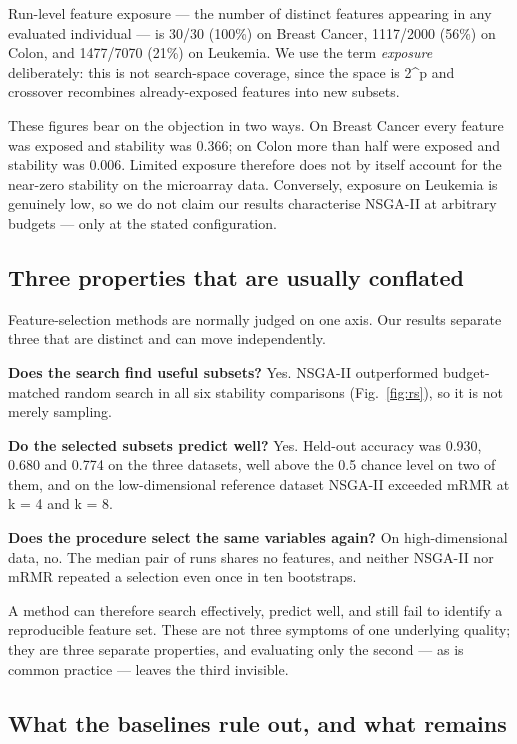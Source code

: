 \documentclass[conference]{IEEEtran}
\begin{document}
Run-level feature exposure --- the number of distinct features appearing in any evaluated individual --- is 30/30 (100\%) on Breast Cancer, 1117/2000 (56\%) on Colon, and 1477/7070 (21\%) on Leukemia. We use the term \emph{exposure} deliberately: this is not search-space coverage, since the space is 2\^{}p and crossover recombines already-exposed features into new subsets.

These figures bear on the objection in two ways. On Breast Cancer every feature was exposed and stability was 0.366; on Colon more than half were exposed and stability was 0.006. Limited exposure therefore does not by itself account for the near-zero stability on the microarray data. Conversely, exposure on Leukemia is genuinely low, so we do not claim our results characterise NSGA-II at arbitrary budgets --- only at the stated configuration.

\subsection{Three properties that are usually conflated}

Feature-selection methods are normally judged on one axis. Our results separate three that are distinct and can move independently.

\textbf{Does the search find useful subsets?} Yes. NSGA-II outperformed budget-matched random search in all six stability comparisons (Fig.~\ref{fig:rs}), so it is not merely sampling.

\textbf{Do the selected subsets predict well?} Yes. Held-out accuracy was 0.930, 0.680 and 0.774 on the three datasets, well above the 0.5 chance level on two of them, and on the low-dimensional reference dataset NSGA-II exceeded mRMR at k = 4 and k = 8.

\textbf{Does the procedure select the same variables again?} On high-dimensional data, no. The median pair of runs shares no features, and neither NSGA-II nor mRMR repeated a selection even once in ten bootstraps.

A method can therefore search effectively, predict well, and still fail to identify a reproducible feature set. These are not three symptoms of one underlying quality; they are three separate properties, and evaluating only the second --- as is common practice --- leaves the third invisible.

\subsection{What the baselines rule out, and what remains}
\end{document}
